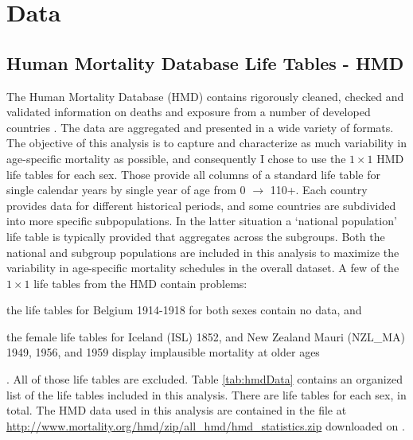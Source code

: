 \documentclass[11pt]{article}
\DeclareRobustCommand{\LTtot}{}
\DeclareRobustCommand{\LTtotBoth}{}
\DeclareRobustCommand{\HMDdate}{ \begingroup\endlinechar=-1 \endgroup}
\begin{document}
\section{Data}

\subsection{Human Mortality Database Life Tables - HMD}

The Human Mortality Database (HMD) \citep{hmd2016} contains rigorously cleaned, checked and validated information on deaths and exposure from a number of  developed countries .  The data are aggregated and presented in a wide variety of formats.  The objective of this analysis is to capture and characterize as much variability in age-specific mortality as possible, and consequently I chose to use the $1 \times 1$ HMD life tables for each sex.  Those provide all columns of a standard life table for single calendar years by single year of age from 0 $\rightarrow$ 110+.  Each country provides data for different historical periods, and some countries are subdivided into more specific subpopulations.  In the latter situation a `national population' life table is typically provided that aggregates across the subgroups.  Both the national and subgroup populations are included in this analysis to maximize the variability in age-specific mortality schedules in the overall dataset.  A few of the $1 \times 1$ life tables from the HMD contain problems:  
\begin{enumerate*}[label=\arabic*)]
\item the life tables for Belgium 1914-1918 for both sexes contain no data, and
\item the female life tables for Iceland (ISL) 1852, and New Zealand Mauri (NZL\_MA) 1949, 1956, and 1959 display implausible mortality at older ages
\end{enumerate*}.  All of those life tables are excluded.  Table \ref{tab:hmdData}  contains an organized list of the life tables included in this analysis.  There are \LTtot life tables for each sex, \LTtotBoth in total.  The HMD data used in this analysis are contained in the file at \url{http://www.mortality.org/hmd/zip/all_hmd/hmd_statistics.zip} downloaded on \HMDdate.
\end{document}
